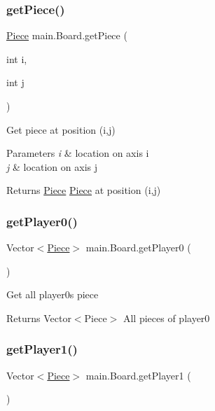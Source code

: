 \subsubsection{\texorpdfstring{getPiece()}{getPiece()}}
{\footnotesize\ttfamily \mbox{\hyperlink{classmain_1_1_piece}{Piece}} main.\+Board.\+get\+Piece (\begin{DoxyParamCaption}\item[{int}]{i,  }\item[{int}]{j }\end{DoxyParamCaption})\hspace{0.3cm}{\ttfamily [inline]}}

Get piece at position (i,j)


\begin{DoxyParams}{Parameters}
{\em i} & location on axis i \\
\hline
{\em j} & location on axis j \\
\hline
\end{DoxyParams}
\begin{DoxyReturn}{Returns}
\mbox{\hyperlink{classmain_1_1_piece}{Piece}} \mbox{\hyperlink{classmain_1_1_piece}{Piece}} at position (i,j) 
\end{DoxyReturn}
\mbox{\label{classmain_1_1_board_ab8f45e143d9ab246851f7f97c5bfa364}} 
\subsubsection{\texorpdfstring{getPlayer0()}{getPlayer0()}}
{\footnotesize\ttfamily Vector$<$\mbox{\hyperlink{classmain_1_1_piece}{Piece}}$>$ main.\+Board.\+get\+Player0 (\begin{DoxyParamCaption}{ }\end{DoxyParamCaption})\hspace{0.3cm}{\ttfamily [inline]}}

Get all player0\textquotesingle{}s piece

\begin{DoxyReturn}{Returns}
Vector$<$\+Piece$>$ All pieces of player0 
\end{DoxyReturn}
\mbox{\label{classmain_1_1_board_aa54c43be78a8a97135eba9eb6a4b7167}} 
\subsubsection{\texorpdfstring{getPlayer1()}{getPlayer1()}}
{\footnotesize\ttfamily Vector$<$\mbox{\hyperlink{classmain_1_1_piece}{Piece}}$>$ main.\+Board.\+get\+Player1 (\begin{DoxyParamCaption}{ }\end{DoxyParamCaption})\hspace{0.3cm}{\ttfamily [inline]}}

